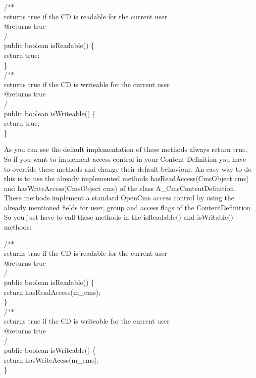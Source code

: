 \begin{java}
\jtaba          /**\\
\jtaba   \xspace * returns true if the CD is readable for the current user\\
\jtaba   \xspace * @returns true\\
\jtaba   \xspace */\\ 
\jtaba public boolean isReadable() \{\\
\jtabb    return true;\\
\jtaba \}\\[1ex]

\jtaba          /**\\
\jtaba   \xspace * returns true if the CD is writeable for the current user\\
\jtaba   \xspace * @returns true\\
\jtaba   \xspace */\\
\jtaba public boolean isWriteable() \{\\
\jtabb    return true;\\
\jtaba \}
\end{java}

As you can see the default implementation of these methods always return true.
So if you want to implement access control in your Content Definition you have
to override these methods and change their default behaviour. An easy way to do
this is to use the already implemented methods {\meth hasReadAccess(CmsObject cms)}
and {\meth hasWriteAccess(CmsObject cms)} of the class {\class A\_CmsContentDefinition}.
These methods implement a standard OpenCms access control by using the already mentioned
fields for user, group and access flags of the ContentDefinition. So you just have to call
these methods in the {\meth isReadable()} and {\meth isWritable()} methods:

\begin{java}
\jtaba 			/**\\
\jtaba   \xspace * returns true if the CD is readable for the current user\\
\jtaba   \xspace * @returns true\\
\jtaba   \xspace */\\ 
\jtaba public boolean isReadable() \{\\
\jtabb    return hasReadAccess(m\_cms);\\
\jtaba \}\\[1ex]

\jtaba          /**\\
\jtaba   \xspace * returns true if the CD is writeable for the current user\\
\jtaba   \xspace * @returns true\\
\jtaba   \xspace */\\
\jtaba public boolean isWriteable() \{\\
\jtabb    return hasWriteAcess(m\_cms);\\
\jtaba \}
\end{java}

